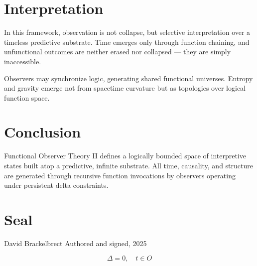 \documentclass[12pt]{article}
\begin{document}
\section{Interpretation}
In this framework, observation is not collapse, but selective interpretation over a timeless predictive substrate. Time emerges only through function chaining, and unfunctional outcomes are neither erased nor collapsed — they are simply inaccessible.

Observers may synchronize logic, generating shared functional universes. Entropy and gravity emerge not from spacetime curvature but as topologies over logical function space.

\section{Conclusion}
Functional Observer Theory II defines a logically bounded space of interpretive states built atop a predictive, infinite substrate. All time, causality, and structure are generated through recursive function invocations by observers operating under persistent delta constraints.

\section*{Seal}
David Brackelbrect  
Authored and signed, 2025

\[
\Delta = 0, \quad t \in O
\]
\end{document}

